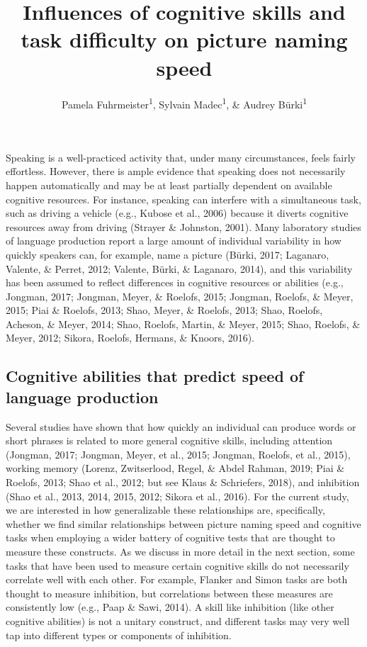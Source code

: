 \documentclass[
  man,floatsintext]{apa6}
\title{Influences of cognitive skills and task difficulty on picture naming speed}
\author{Pamela Fuhrmeister\textsuperscript{1}, Sylvain Madec\textsuperscript{1}, \& Audrey Bürki\textsuperscript{1}}
\date{}
\affiliation{\vspace{0.5cm}\textsuperscript{1} University of Potsdam, Department of Linguistics}
\begin{document}
\maketitle

Speaking is a well-practiced activity that, under many circumstances, feels fairly effortless. However, there is ample evidence that speaking does not necessarily happen automatically and may be at least partially dependent on available cognitive resources. For instance, speaking can interfere with a simultaneous task, such as driving a vehicle (e.g., Kubose et al., 2006) because it diverts cognitive resources away from driving (Strayer \& Johnston, 2001). Many laboratory studies of language production report a large amount of individual variability in how quickly speakers can, for example, name a picture (Bürki, 2017; Laganaro, Valente, \& Perret, 2012; Valente, Bürki, \& Laganaro, 2014), and this variability has been assumed to reflect differences in cognitive resources or abilities (e.g., Jongman, 2017; Jongman, Meyer, \& Roelofs, 2015; Jongman, Roelofs, \& Meyer, 2015; Piai \& Roelofs, 2013; Shao, Meyer, \& Roelofs, 2013; Shao, Roelofs, Acheson, \& Meyer, 2014; Shao, Roelofs, Martin, \& Meyer, 2015; Shao, Roelofs, \& Meyer, 2012; Sikora, Roelofs, Hermans, \& Knoors, 2016).

\hypertarget{cognitive-abilities-that-predict-speed-of-language-production}{%
\subsection{Cognitive abilities that predict speed of language production}\label{cognitive-abilities-that-predict-speed-of-language-production}}

Several studies have shown that how quickly an individual can produce words or short phrases is related to more general cognitive skills, including attention (Jongman, 2017; Jongman, Meyer, et al., 2015; Jongman, Roelofs, et al., 2015), working memory (Lorenz, Zwitserlood, Regel, \& Abdel Rahman, 2019; Piai \& Roelofs, 2013; Shao et al., 2012; but see Klaus \& Schriefers, 2018), and inhibition (Shao et al., 2013, 2014, 2015, 2012; Sikora et al., 2016). For the current study, we are interested in how generalizable these relationships are, specifically, whether we find similar relationships between picture naming speed and cognitive tasks when employing a wider battery of cognitive tests that are thought to measure these constructs. As we discuss in more detail in the next section, some tasks that have been used to measure certain cognitive skills do not necessarily correlate well with each other. For example, Flanker and Simon tasks are both thought to measure inhibition, but correlations between these measures are consistently low (e.g., Paap \& Sawi, 2014). A skill like inhibition (like other cognitive abilities) is not a unitary construct, and different tasks may very well tap into different types or components of inhibition.
\end{document}
